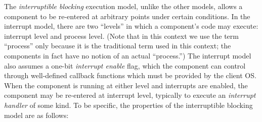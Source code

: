 The \emph{interruptible blocking} execution model,
unlike the other models,
allows a component to be re-entered at arbitrary points
under certain conditions.
In the interrupt model,
there are two ``levels'' in which a component's code may execute:
interrupt level and process level.
(Note that in this context we use the term ``process''
only because it is the traditional term used in this context;
the components in fact have no notion of an actual ``process.'')
The interrupt model also assumes a one-bit \emph{interrupt enable} flag,
which the component can control through well-defined callback functions
which must be provided by the client OS\@.
When the component is running at either level and interrupts are enabled,
the component may be re-entered at interrupt level,
typically to execute an \emph{interrupt handler} of some kind.
To be specific,
the properties of the interruptible blocking model are as follows:
